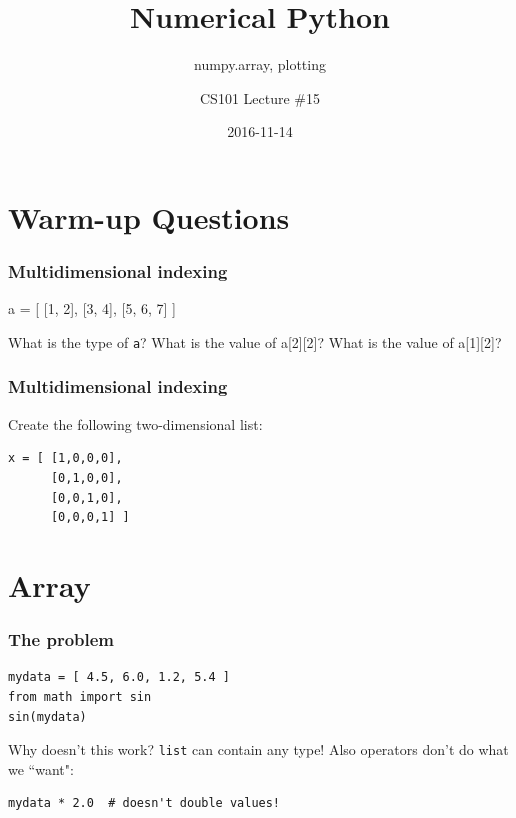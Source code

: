 \documentclass[11pt]{beamer}
\title{Numerical Python}
\subtitle{numpy.array, plotting}
\author{CS101 Lecture \#15}
\date{2016-11-14}
\begin{document}
  \setcounter{showProgressBar}{0}
  \setcounter{showSlideNumbers}{0}

\frame{\titlepage}

\setcounter{framenumber}{0}
\setcounter{showProgressBar}{1}
\setcounter{showSlideNumbers}{1}


\section{Warm-up Questions}


\begin{frame}[fragile]
  \frametitle{Multidimensional indexing}
  \Enlarge
  
a = [ [1, 2], [3, 4], [5, 6, 7] ]

\begin{enumerate}
\myitem What is the type of \texttt{a}?
\myitem What is the value of a[2][2]?
\myitem What is the value of a[1][2]?
\end{enumerate}

\end{frame}


\begin{frame}[fragile]
  \frametitle{Multidimensional indexing}
  \Enlarge
Create the following two-dimensional list:
  
\begin{Verbatim}
x = [ [1,0,0,0],
      [0,1,0,0],
      [0,0,1,0],
      [0,0,0,1] ]
\end{Verbatim}


\end{frame}

\section{Array}

\begin{frame}[fragile]
  \frametitle{The problem}
  \Enlarge

  \begin{Verbatim}
mydata = [ 4.5, 6.0, 1.2, 5.4 ]
from math import sin
sin(mydata)
  \end{Verbatim}
  \begin{enumerate}
  \myitem  Why doesn't this work? %
  \mysubitem  \texttt{list} can contain any type!
  \myitem  Also operators don't do what we ``want":
  \end{enumerate}
  \begin{Verbatim}
mydata * 2.0  # doesn't double values!
  \end{Verbatim}
\end{frame}
\end{document}
